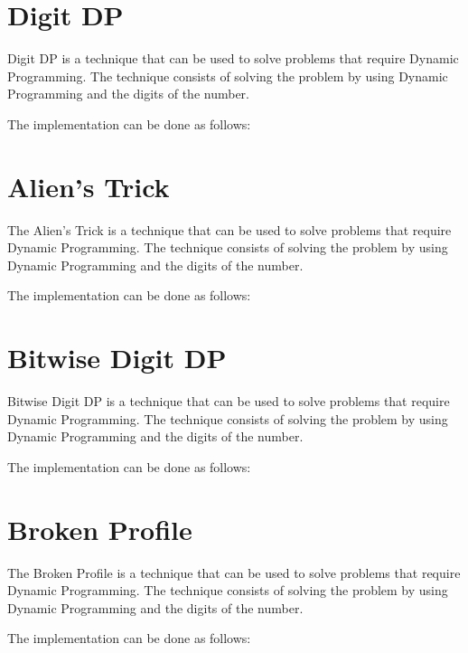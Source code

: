 



\section{Digit DP}

Digit DP is a technique that can be used to solve problems that require Dynamic Programming. The technique consists of solving the problem by using Dynamic Programming and the digits of the number.

The implementation can be done as follows:



\section{Alien's Trick}

The Alien's Trick is a technique that can be used to solve problems that require Dynamic Programming. The technique consists of solving the problem by using Dynamic Programming and the digits of the number.

The implementation can be done as follows:



\section{Bitwise Digit DP}

Bitwise Digit DP is a technique that can be used to solve problems that require Dynamic Programming. The technique consists of solving the problem by using Dynamic Programming and the digits of the number.

The implementation can be done as follows:



\section{Broken Profile}

The Broken Profile is a technique that can be used to solve problems that require Dynamic Programming. The technique consists of solving the problem by using Dynamic Programming and the digits of the number.

The implementation can be done as follows:


